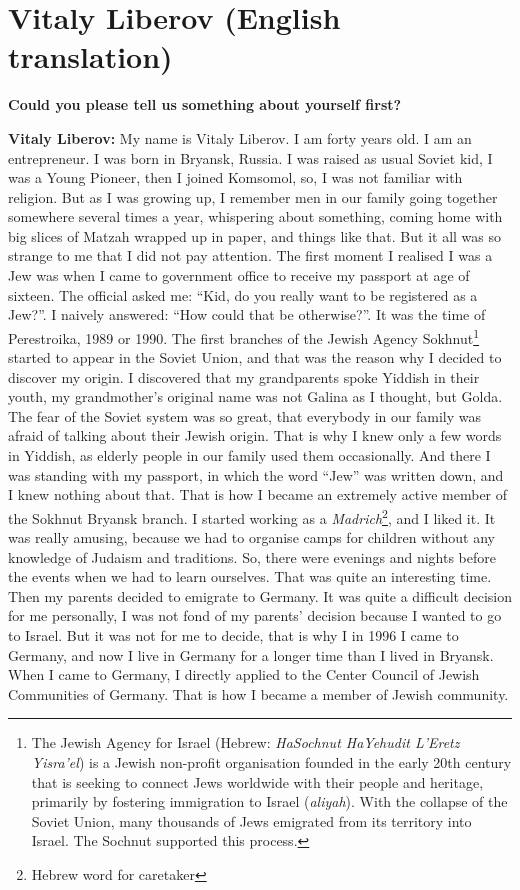 \section{Vitaly Liberov (English translation)}

\textbf{Could you please tell us something about yourself first?} 

\textbf{Vitaly Liberov:} My name is Vitaly Liberov. I am forty years old. I am an entrepreneur. I was born in Bryansk, Russia. I was raised as usual Soviet kid, I was a Young Pioneer, then I joined Komsomol, so, I was not familiar with religion. But as I was growing up, I remember men in our family going together somewhere several times a year, whispering about something, coming home with big slices of Matzah wrapped up in paper, and things like that. But it all was so strange to me that I did not pay attention. The first moment I realised I was a Jew was when I came to government office to receive my passport at age of sixteen. The official asked me: “Kid, do you really want to be registered as a Jew?”. I naively answered: “How could that be otherwise?”. It was the time of Perestroika, 1989 or 1990. The first branches of the Jewish Agency Sokhnut\footnote{The Jewish Agency for Israel (Hebrew: \textit{HaSochnut HaYehudit L'Eretz Yisra'el}) is a Jewish non-profit organisation founded in the early 20th century that is seeking to connect Jews worldwide with their people and heritage, primarily by fostering immigration to Israel (\textit{aliyah}). With the collapse of the Soviet Union, many thousands of Jews emigrated from its territory into Israel. The Sochnut supported this process.} started to appear in the Soviet Union, and that was the reason why I decided to discover my origin. I discovered that my grandparents spoke Yiddish in their youth, my grandmother’s original name was not Galina as I thought, but Golda. The fear of the Soviet system was so great, that everybody in our family was afraid of talking about their Jewish origin. That is why I knew only a few words in Yiddish, as elderly people in our family used them occasionally. And there I was standing with my passport, in which the word “Jew” was written down, and I knew nothing about that. That is how I became an extremely active member of the Sokhnut Bryansk branch. I started working as a \textit{Madrich}\footnote{Hebrew word for caretaker}, and I liked it.  It was really amusing, because we had to organise camps for children without any knowledge of Judaism and traditions. So, there were evenings and nights before the events when we had to learn ourselves. That was quite an interesting time. Then my parents decided to emigrate to Germany. It was quite a difficult decision for me personally, I was not fond of my parents’ decision because I wanted to go to Israel. But it was not for me to decide, that is why I in 1996 I came to Germany, and now I live in Germany for a longer time than I lived in Bryansk. When I came to Germany, I directly applied to the Center Council of Jewish Communities of Germany. That is how I became a member of Jewish community.  

